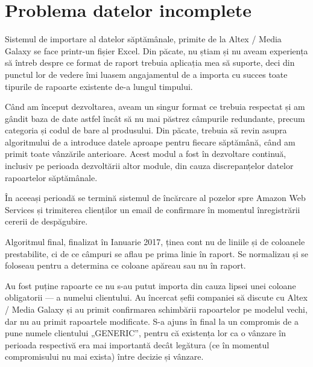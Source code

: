 \section{Problema datelor incomplete}

	Sistemul de importare al datelor săptămânale, primite de la Altex / Media Galaxy se face printr-un fișier Excel.
	Din păcate, nu știam și nu aveam experiența să întreb despre ce format de raport trebuia aplicația mea să suporte, deci din punctul lor de vedere îmi luasem angajamentul de a importa cu succes toate tipurile de rapoarte existente de-a lungul timpului.

	Când am început dezvoltarea, aveam un singur format ce trebuia respectat și am gândit baza de date astfel încât să nu mai păstrez câmpurile redundante, precum categoria și codul de bare al produsului.
	Din păcate, trebuia să revin asupra algoritmului de a introduce datele aproape pentru fiecare săptămână, când am primit toate vânzările anterioare.
	Acest modul a fost în dezvoltare continuă, inclusiv pe perioada dezvoltării altor module, din cauza discrepanțelor datelor rapoartelor săptămânale.

	În aceeași perioadă se termină sistemul de încărcare al pozelor spre Amazon Web Services și trimiterea clienților un email de confirmare în momentul înregistrării cererii de despăgubire.

	Algoritmul final, finalizat în Ianuarie 2017, ținea cont nu de liniile și de coloanele prestabilite, ci de ce câmpuri se aflau pe prima linie în raport.
	Se normalizau și se foloseau pentru a determina ce coloane apăreau sau nu în raport.

	Au fost puține rapoarte ce nu s-au putut importa din cauza lipsei unei coloane obligatorii --- a numelui clientului.
	Au încercat șefii companiei să discute cu Altex / Media Galaxy și au primit confirmarea schimbării rapoartelor pe modelul vechi, dar nu au primit rapoartele modificate.
	S-a ajuns în final la un compromis de a pune numele clientului „GENERIC”, pentru că existența lor ca o vânzare în perioada respectivă era mai importantă decât legătura (ce în momentul compromisului nu mai exista) între decizie și vânzare.
